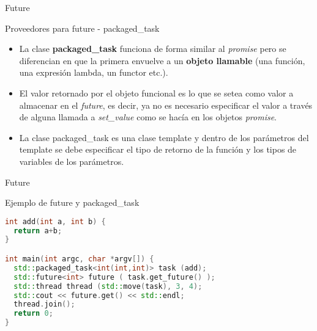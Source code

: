 \begin{frame}{Future}
\begin{block}{Proveedores para future - packaged\_task}
\begin{itemize}
  \item La clase \textbf{packaged\_task} funciona de forma similar al \textit{promise} pero se diferencian en que la primera envuelve a un \textbf{objeto llamable} (una función, una expresión lambda, un functor etc.).
  \item El valor retornado por el objeto funcional es lo que se setea como valor a almacenar en el \textit{future}, es decir, ya no es necesario especificar el valor a través de alguna llamada a \textit{set\_value} como se hacía en los objetos \textit{promise}.
  \item La clase packaged\_task es una clase template y dentro de los parámetros del template se debe especificar el tipo de retorno de la función y los tipos de variables de los parámetros.
\end{itemize}
\end{block}
\end{frame}

\begin{frame}[fragile]{Future}
\begin{block}{Ejemplo de future y packaged\_task}
\begin{lstlisting}[language=C++, basicstyle=\small]
int add(int a, int b) {
  return a+b;
}

int main(int argc, char *argv[]) {
  std::packaged_task<int(int,int)> task (add);
  std::future<int> future ( task.get_future() );
  std::thread thread (std::move(task), 3, 4);
  std::cout << future.get() << std::endl;
  thread.join();  
  return 0;
}
\end{lstlisting}
\end{block}
\end{frame}